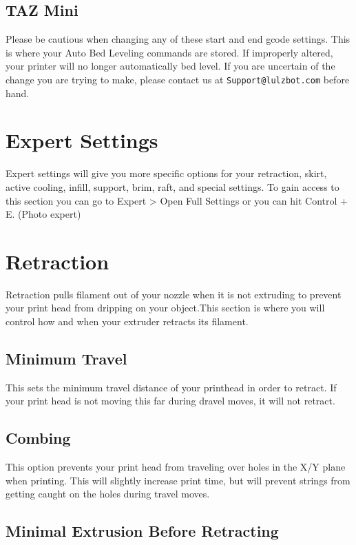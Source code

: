 \subsection{TAZ Mini}
Please be cautious when changing any of these start and end gcode settings. This is where your Auto Bed Leveling commands are stored. If improperly altered, your printer will no longer 	automatically bed level. If you are uncertain of the change you are trying to make, please contact us at \texttt{Support@lulzbot.com} before hand.

\section{Expert Settings}

Expert settings will give you more specific options for your retraction, skirt, active cooling, infill, support, brim, raft, and special settings. To gain access to this section you can go to Expert > Open Full Settings or you can hit Control + E. (Photo expert)

\section{Retraction}

Retraction pulls filament out of your nozzle when it is not extruding to prevent your print head from dripping on your object.This section is where you will control how and when your extruder retracts its filament.

\subsection{Minimum Travel}

This sets the minimum travel distance of your printhead in order to retract. If your print head is not moving this far during dravel moves, it will not retract.

\subsection{Combing}

This option prevents your print head from traveling over holes in the X/Y plane when printing. This will slightly increase print time, but will prevent strings from getting caught on the holes during travel moves.

\subsection{Minimal Extrusion Before Retracting}

